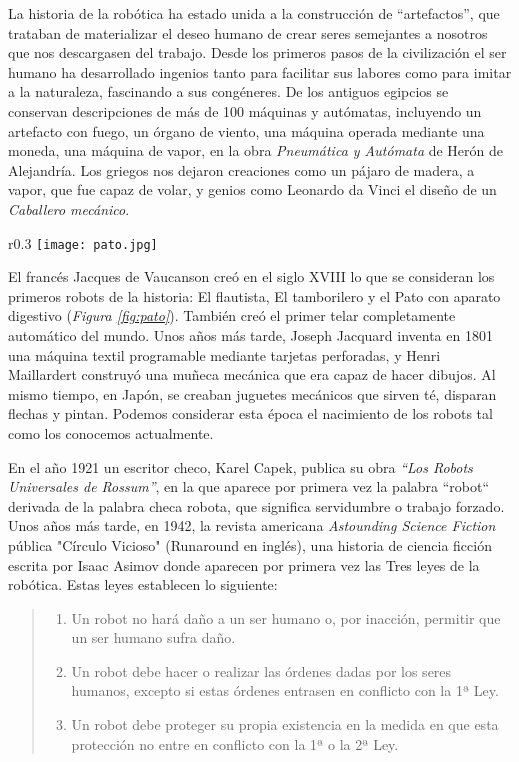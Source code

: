 La historia de la robótica ha estado unida a la construcción de “artefactos”, que trataban de materializar el deseo humano de crear seres semejantes a nosotros que nos descargasen del trabajo. Desde los primeros pasos de la civilización el ser humano ha desarrollado ingenios tanto para facilitar sus labores como para imitar a la naturaleza, fascinando a sus congéneres. De los antiguos egipcios se conservan descripciones de más de 100 máquinas y autómatas, incluyendo un artefacto con fuego, un órgano de viento, una máquina operada mediante una moneda, una máquina de vapor, en la obra \textit{Pneumática y Autómata} de Herón de Alejandría. Los griegos nos dejaron creaciones como un pájaro de madera, a vapor, que fue capaz de volar, y genios como Leonardo da Vinci el diseño de un \textit{Caballero mecánico}. 

\begin{wrapfigure}{r}{0.3\textwidth}
	\centering
	\texttt{[image: pato.jpg]}
	\caption{Pato con aparato digestivo de Jacques de Vaucanson.} \label{fig:pato}
\end{wrapfigure}
El francés Jacques de Vaucanson creó en el siglo XVIII lo que se consideran los primeros robots de la historia: El flautista, El tamborilero y el Pato con aparato digestivo (\textit{Figura \ref{fig:pato}}). También creó el primer telar completamente automático del mundo. Unos años más tarde, Joseph Jacquard inventa en 1801 una máquina textil programable mediante tarjetas perforadas, y Henri Maillardert construyó una muñeca mecánica que era capaz de hacer dibujos. Al mismo tiempo, en Japón, se creaban juguetes mecánicos que sirven té, disparan flechas y pintan. Podemos considerar esta época el nacimiento de los robots tal como los conocemos actualmente.

En el año 1921 un escritor checo, Karel Capek, publica su obra \textit{“Los Robots Universales de Rossum”}, en la que aparece por primera vez la palabra “robot“ derivada de la palabra checa robota, que significa servidumbre o trabajo forzado. Unos años más tarde, en 1942, la revista americana \textit{Astounding Science Fiction} pública "Círculo Vicioso" (Runaround en inglés), una historia de ciencia ficción escrita por Isaac Asimov donde aparecen por primera vez las Tres leyes de la robótica. Estas leyes establecen lo siguiente:
\begin{quote}
\begin{enumerate}[1.ª]
	\item Un robot no hará daño a un ser humano o, por inacción, permitir que un ser humano sufra daño.
	\item Un robot debe hacer o realizar las órdenes dadas por los seres humanos, excepto si estas órdenes entrasen en conflicto con la 1ª Ley.
	\item Un robot debe proteger su propia existencia en la medida en que esta protección no entre en conflicto con la 1ª o la 2ª Ley.
\end{enumerate}
\end{quote}


